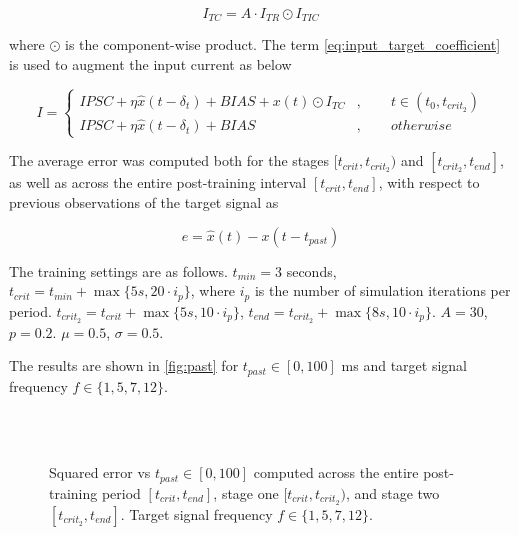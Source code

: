 \documentclass[10pt,a4paper, final]{report} %
\begin{document}
\begin{equation}
I_{TC} = A \cdot I_{TR} \odot I_{TIC}
\label{eq:input_target_coefficient}
\end{equation}

where $\odot$ is the component-wise product. The term \eqref{eq:input_target_coefficient} is used to augment the input current as below

\begin{equation}
I = 
\begin{cases} 
IPSC + \eta \hat{x}(t- \delta_t) + BIAS + x(t) \odot I_{TC} &,\qquad t \in (t_0, t_{crit_2}) \\
IPSC + \eta \hat{x}(t- \delta_t) + BIAS &,\qquad otherwise
\end{cases}
\label{eq:current_past}
\end{equation}

The average error was computed both for the stages $[t_{crit}, t_{crit_2})$ and $[t_{crit_2}, t_{end}]$, as well as across the entire post-training interval $[t_{crit}, t_{end}]$, with respect to previous observations of the target signal as

\begin{equation}
e = \hat{x}(t) - x(t - t_{past})
\end{equation}

The training settings are as follows. 
$t_{min} = 3$ seconds, $t_{crit} = t_{min} + \max \{5 s, 20 \cdot i_p \}$, where $i_p$ is the number of simulation iterations per period.
$t_{crit_2} = t_{crit} + \max \{ 5 s, 10 \cdot i_p \}$,
$t_{end} = t_{crit_2} + \max \{8 s, 10 \cdot i_p \}$. $A = 30$, $p=0.2$. $\mu = 0.5$, $\sigma = 0.5$.

The results are shown in \autoref{fig:past} for $t_{past} \in [0, 100]$ ms and target signal frequency $f \in \{ 1,5,7,12 \}$.


\begin{figure}[H]
\centering
{}
\\
\\
\caption{Squared error vs $t_{past} \in [0,100]$ computed across the entire post-training period $[t_{crit}, t_{end}]$, stage one $[t_{crit}, t_{crit_2})$, and stage two $[t_{crit_2}, t_{end}]$. Target signal frequency $f \in \{1, 5, 7, 12\}$.}
\label{fig:past}
\end{figure}
\end{document}
